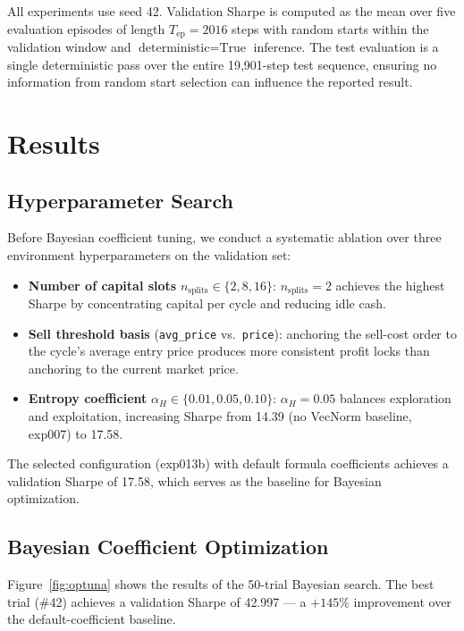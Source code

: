 \documentclass[11pt, a4paper]{article}
\begin{document}
All experiments use seed 42.
Validation Sharpe is computed as the mean over five evaluation episodes of length
$T_\text{ep} = 2016$ steps with random starts within the validation window and
$\text{deterministic}=\text{True}$ inference.
The test evaluation is a single deterministic pass over the entire 19,901-step
test sequence, ensuring no information from random start selection can influence
the reported result.

\section{Results}

\subsection{Hyperparameter Search}
\label{sec:param-search}

Before Bayesian coefficient tuning, we conduct a systematic ablation over three
environment hyperparameters on the validation set:

\begin{itemize}
    \item \textbf{Number of capital slots} $n_\text{splits} \in \{2, 8, 16\}$:
          $n_\text{splits}=2$ achieves the highest Sharpe by concentrating capital
          per cycle and reducing idle cash.
    \item \textbf{Sell threshold basis} (\texttt{avg\_price} vs.\ \texttt{price}):
          anchoring the sell-cost order to the cycle's average entry price produces
          more consistent profit locks than anchoring to the current market price.
    \item \textbf{Entropy coefficient} $\alpha_H \in \{0.01, 0.05, 0.10\}$:
          $\alpha_H = 0.05$ balances exploration and exploitation, increasing
          Sharpe from 14.39 (no VecNorm baseline, exp007) to 17.58.
\end{itemize}

The selected configuration (exp013b) with default formula coefficients achieves a
validation Sharpe of 17.58, which serves as the baseline for Bayesian optimization.

\subsection{Bayesian Coefficient Optimization}

Figure~\ref{fig:optuna} shows the results of the 50-trial Bayesian search.
The best trial (\#42) achieves a validation Sharpe of 42.997 — a $+145\%$
improvement over the default-coefficient baseline.
\end{document}
